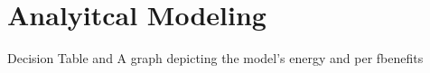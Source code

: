 \section{Analyitcal Modeling}\label{sec:analytic}

Decision Table and A graph depicting the model's energy and per fbenefits
